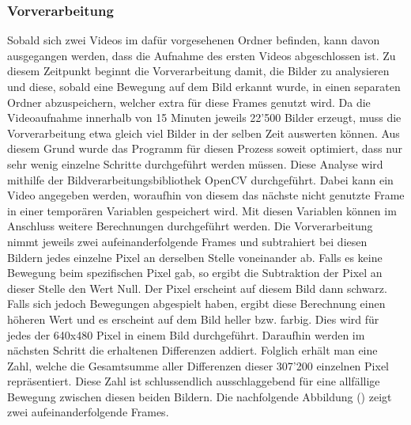 \subsubsection{Vorverarbeitung}
Sobald sich zwei Videos im dafür vorgesehenen Ordner befinden, kann davon ausgegangen werden, dass die Aufnahme des ersten Videos abgeschlossen ist. Zu diesem Zeitpunkt beginnt die Vorverarbeitung damit, die Bilder zu analysieren und diese, sobald eine Bewegung auf dem Bild erkannt wurde, in einen separaten Ordner abzuspeichern, welcher extra für diese Frames genutzt wird. Da die Videoaufnahme innerhalb von 15 Minuten jeweils 22'500 Bilder erzeugt, muss die Vorverarbeitung etwa gleich viel Bilder in der selben Zeit auswerten können. Aus diesem Grund wurde das Programm für diesen Prozess soweit optimiert, dass nur sehr wenig einzelne Schritte durchgeführt werden müssen. Diese Analyse wird mithilfe der Bildverarbeitungsbibliothek OpenCV durchgeführt. Dabei kann ein Video angegeben werden, woraufhin von diesem das nächste nicht genutzte Frame in einer temporären Variablen gespeichert wird. Mit diesen Variablen können im Anschluss weitere Berechnungen durchgeführt werden. Die Vorverarbeitung nimmt jeweils zwei aufeinanderfolgende Frames und subtrahiert bei diesen Bildern jedes einzelne Pixel an derselben Stelle voneinander ab. Falls es keine Bewegung beim spezifischen Pixel gab, so ergibt die Subtraktion der Pixel an dieser Stelle den Wert Null. Der Pixel erscheint auf diesem Bild dann schwarz. Falls sich jedoch Bewegungen abgespielt haben, ergibt diese Berechnung einen höheren Wert und es erscheint auf dem Bild heller bzw. farbig. Dies wird für jedes der 640x480 Pixel in einem Bild durchgeführt. Daraufhin werden im nächsten Schritt die erhaltenen Differenzen addiert. Folglich erhält man eine Zahl, welche die Gesamtsumme aller Differenzen dieser 307'200 einzelnen Pixel repräsentiert. Diese Zahl ist schlussendlich ausschlaggebend für eine allfällige Bewegung zwischen diesen beiden Bildern. Die nachfolgende Abbildung () zeigt zwei aufeinanderfolgende Frames.

